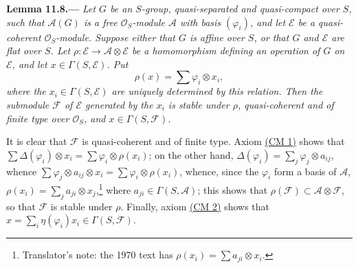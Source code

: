 
\medskip
{}\label{lem:sga3-VIB-11.8}%
\noindent\textbf{Lemma 11.8.---}
\emph{Let \(G\) be an \(S\)-group, quasi-separated and
quasi-compact over \(S\), such that \(\mathcal A(G)\) is a free
\(\mathcal O_S\)-module \(\mathcal A\) with basis
\((\varphi_i)\), and let \(\mathcal E\) be a quasi-coherent
\(\mathcal O_S\)-module. Suppose either that \(G\) is affine
over \(S\), or that \(G\) and \(\mathcal E\) are flat over
\(S\). Let \(\rho:\mathcal E\to\mathcal A\otimes\mathcal E\) be a
homomorphism defining an operation of \(G\) on \(\mathcal E\),
and let \(x\in\Gamma(S,\mathcal E)\). Put}
\[
  \rho(x)=\sum\varphi_i\otimes x_i,
\]
\emph{where the \(x_i\in\Gamma(S,\mathcal E)\) are uniquely
determined by this relation. Then the submodule
\(\mathcal F\) of \(\mathcal E\) generated by the \(x_i\) is
stable under \(\rho\), quasi-coherent and of finite type over
\(\mathcal O_S\), and \(x\in\Gamma(S,\mathcal F)\).}

It is clear that \(\mathcal F\) is quasi-coherent and of finite
type. Axiom \hyperref[cond:sga3-VIB-11.6-CM1]{\textup{(CM 1)}}
shows that
\(\sum\Delta(\varphi_i)\otimes x_i=\sum\varphi_i\otimes\rho(x_i)\);
on the other hand,
\(\Delta(\varphi_i)=\sum_j\varphi_j\otimes a_{ij}\), whence
\(\sum\varphi_j\otimes a_{ij}\otimes x_i
=\sum\varphi_i\otimes\rho(x_i)\), whence, since the
\(\varphi_i\) form a basis of \(\mathcal A\),
\(\rho(x_i)=\sum_ja_{ji}\otimes x_j\),\footnote{Translator's
note: the 1970 text has \(\rho(x_i)=\sum a_{ji}\otimes x_i\).}
where \(a_{ji}\in\Gamma(S,\mathcal A)\); this shows that
\(\rho(\mathcal F)\subset\mathcal A\otimes\mathcal F\), so that
\(\mathcal F\) is stable under \(\rho\). Finally, axiom
\hyperref[cond:sga3-VIB-11.6-CM2]{\textup{(CM 2)}}
shows that \(x=\sum_i\eta(\varphi_i)x_i\in\Gamma(S,\mathcal F)\).

